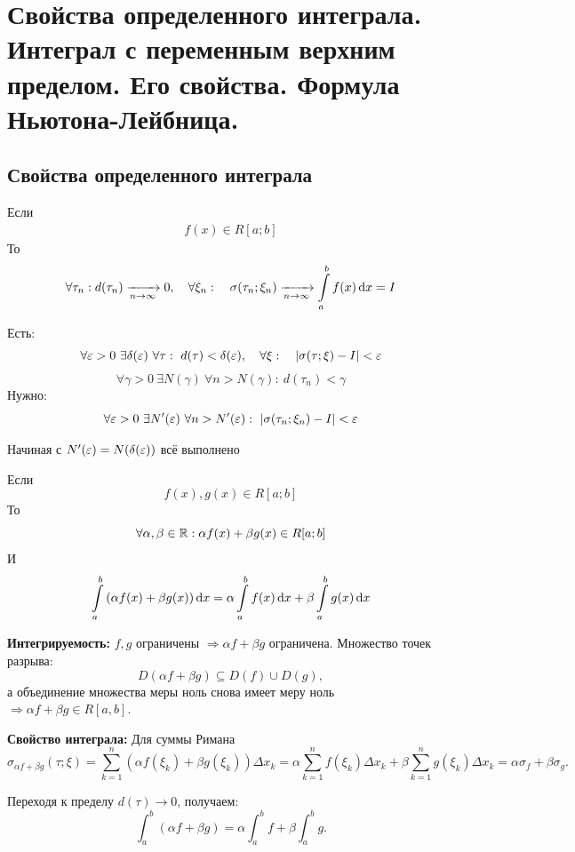 \section{Свойства определенного интеграла. Интеграл с переменным верхним пределом. Его свойства. Формула Ньютона-Лейбница.}

\subsection{Свойства определенного интеграла}
\begin{theorem}
    
    Если\\
    \[
    \begin{aligned}
        f(x) \in R[a; b]
    \end{aligned}
    \]
    То\\
   \[
        \forall \tau_n : d(\tau_n) \xrightarrow[n \to \infty]{} 0,\quad \forall \xi_n:
        \quad\sigma(\tau_n; \xi_n) \xrightarrow[n \to \infty]{} \int\limits_{a}^{b} f(x) \mathop{}\!\mathrm{d} x = I
    \]
\end{theorem}
\begin{Proof}
    Есть:\\
    \[
        \forall \varepsilon > 0~ \exists\delta(\varepsilon)~ \forall\tau: ~d(\tau) < \delta(\varepsilon),\quad
        \forall \xi:\quad |\sigma(\tau; \xi) - I| < \varepsilon
    \]
    \[
        \forall\gamma > 0~\exists N(\gamma)~ \forall n > N(\gamma):~ d(\tau_n) < \gamma
    \]
    Нужно:\\
    \[
        \forall \varepsilon > 0~ \exists N'(\varepsilon)~ \forall n > N'(\varepsilon):~ |\sigma(\tau_n; \xi_n) - I| < \varepsilon\\
    \]

    Начиная с $N'(\varepsilon) = N(\delta(\varepsilon))$ всё выполнено
\end{Proof}

\begin{theorem}[Линейность]
    Если
    \[
        f(x), g(x) \in R[a; b]
    \]
    То
    \[
        \forall\alpha, \beta \in \mathbb{R}: \alpha f(x) + \beta g(x) \in R[a; b]
    \]
    И
    \[
        \int\limits_{a}^{b}{(\alpha f(x) + \beta g(x))\mathop{}\!\mathrm{d} x} = \alpha\int\limits_{a}^{b}{f(x)\mathop{}\!\mathrm{d} x} + \beta\int\limits_{a}^{b}{g(x)\mathop{}\!\mathrm{d} x}
    \]
\end{theorem}

\begin{Proof}
\textbf{Интегрируемость:} 
$f,g$ ограничены $\Rightarrow \alpha f + \beta g$ ограничена.  
Множество точек разрыва:
\[
D(\alpha f + \beta g) \subseteq D(f) \cup D(g),
\]
а объединение множества меры ноль снова имеет меру ноль $\Rightarrow \alpha f + \beta g \in R[a,b]$.

\textbf{Свойство интеграла:} 
Для суммы Римана
\[
\sigma_{\alpha f + \beta g}(\tau;\xi) = \sum_{k=1}^n (\alpha f(\xi_k) + \beta g(\xi_k))\Delta x_k
= \alpha \sum_{k=1}^n f(\xi_k)\Delta x_k + \beta \sum_{k=1}^n g(\xi_k)\Delta x_k
= \alpha \sigma_f + \beta \sigma_g.
\]

Переходя к пределу $d(\tau)\to 0$, получаем:
\[
\int_a^b (\alpha f + \beta g) = \alpha \int_a^b f + \beta \int_a^b g.
\]
\end{Proof}
    
